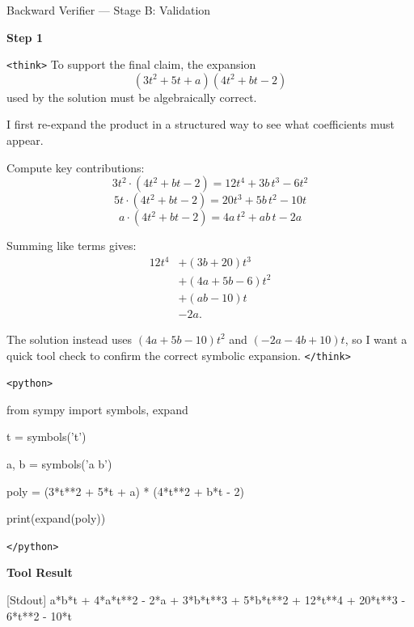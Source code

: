\documentclass[11pt]{article}
\begin{document}
\begin{exbox}{Backward Verifier — Stage B: Validation}

\textbf{Step 1}

\texttt{<think>}
To support the final claim, the expansion
\[
(3t^2+5t+a)(4t^2+bt-2)
\]
used by the solution must be algebraically correct.

I first re-expand the product in a structured way to see what coefficients
must appear.

Compute key contributions:
\[
3t^2\cdot(4t^2+bt-2)=12t^4+3b\,t^3-6t^2
\]
\[
5t\cdot(4t^2+bt-2)=20t^3+5b\,t^2-10t
\]
\[
a\cdot(4t^2+bt-2)=4a\,t^2+ab\,t-2a
\]

Summing like terms gives:
\[
\begin{aligned}
12t^4
&+ (3b+20)t^3 \\
&+ (4a+5b-6)t^2 \\
&+ (ab-10)t \\
&- 2a.
\end{aligned}
\]

The solution instead uses $(4a+5b-10)t^2$ and $(-2a-4b+10)t$, so I want a quick
tool check to confirm the correct symbolic expansion.
\texttt{</think>}

\texttt{<python>}

from sympy import symbols, expand

t = symbols('t')

a, b = symbols('a b')

poly = (3*t**2 + 5*t + a) * (4*t**2 + b*t - 2)

print(expand(poly))

\texttt{</python>}

\textbf{Tool Result}

[Stdout]
a*b*t + 4*a*t**2 - 2*a + 3*b*t**3 + 5*b*t**2 + 12*t**4 + 20*t**3 - 6*t**2 - 10*t

\end{exbox}
\end{document}
